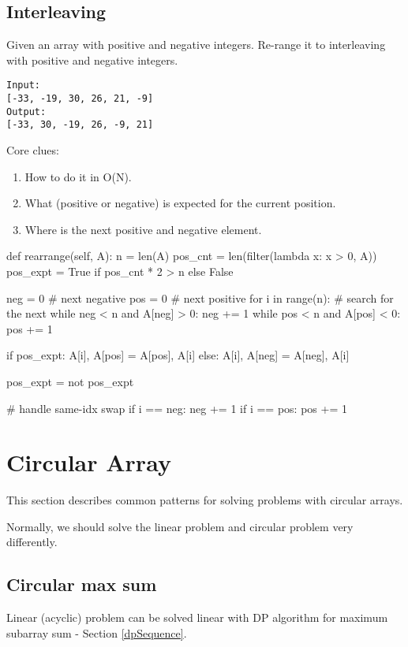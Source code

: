 \subsection{Interleaving}
 Given an array with positive and negative integers. Re-range it to interleaving with positive and negative integers.
\begin{lstlisting}
Input:
[-33, -19, 30, 26, 21, -9]
Output:
[-33, 30, -19, 26, -9, 21]
\end{lstlisting}
Core clues:
\begin{enumerate}
\item How to do it in O(N).
\item What (positive or negative) is expected for the current position.
\item Where is the next positive and negative element.
\end{enumerate}
\begin{python}
def rearrange(self, A):
    n = len(A)
    pos_cnt = len(filter(lambda x: x > 0, A))
    pos_expt = True if pos_cnt * 2 > n else False

    neg = 0  # next negative
    pos = 0  # next positive
    for i in range(n):
        # search for the next 
        while neg < n and A[neg] > 0:
            neg += 1
        while pos < n and A[pos] < 0:
            pos += 1
        
        if pos_expt:
            A[i], A[pos] = A[pos], A[i]
        else:
            A[i], A[neg] = A[neg], A[i]
        
        pos_expt = not pos_expt
        
        # handle same-idx swap
        if i == neg:
            neg += 1
        if i == pos:
            pos += 1
\end{python}

\section{Circular Array}
This section describes common patterns for solving problems with circular arrays.

Normally, we should solve the linear problem and circular problem very differently.

\subsection{Circular max sum}
Linear (acyclic) problem can be solved linear with DP algorithm for maximum subarray sum - Section \ref{dpSequence}. 

